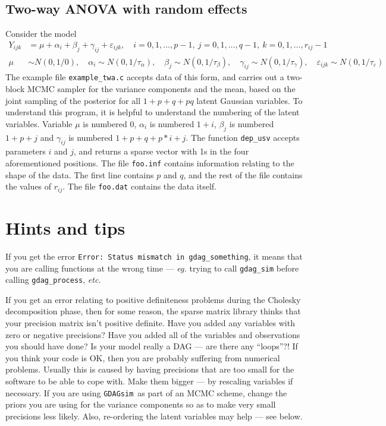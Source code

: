\documentclass[12pt,a4paper]{article}
\newcommand{\gds}{\texttt{GDAGsim}}
\newcommand{\eps}{\varepsilon}
\begin{document}
\subsection{Two-way ANOVA with random effects}

Consider the model
\begin{align*}
Y_{ijk} &= \mu + \alpha_i + \beta_j + \gamma_{ij} + \eps_{ijk},\quad
i=0,1,\ldots,p-1,\ j=0,1,\ldots,q-1,\ k=0,1,\ldots,r_{ij}-1 \\
\mu &\sim N(0,1/0),\quad \alpha_i \sim N(0,1/\tau_\alpha),\quad
\beta_j \sim N(0,1/\tau_\beta),\quad 
\gamma_{ij} \sim N(0,1/\tau_\gamma),\quad 
\eps_{ijk} \sim N(0,1/\tau_\eps)
\end{align*}
The example file \verb$example_twa.c$ accepts data of this form, and
carries out a two-block MCMC sampler for the variance components and
the mean, based on the joint sampling of the posterior for all
$1+p+q+pq$ latent Gaussian variables. To understand this program, it is
helpful to understand the numbering of the latent variables. Variable
$\mu$ is numbered 0, $\alpha_i$ is numbered $1+i$, $\beta_j$ is
numbered $1+p+j$ and $\gamma_{ij}$ is numbered $1+p+q+p*i+j$. The
function \verb$dep_usv$ accepts parameters $i$ and $j$, and returns a
sparse vector with 1s in the four aforementioned positions. The file
\verb$foo.inf$ contains information relating to the shape of the
data. The first line contains $p$ and $q$, and the rest of the file
contains the values of $r_{ij}$. The file \verb$foo.dat$ contains the
data itself.

\section{Hints and tips}

If you get the error 
\verb$Error: Status mismatch in gdag_something$, it means that you are
calling functions at the wrong time --- \emph{eg.} trying to call
\verb$gdag_sim$ before calling \verb$gdag_process$, \emph{etc.}

If you get an error relating to positive definiteness problems during
the Cholesky decomposition phase, then for some reason, the sparse
matrix library thinks that your precision matrix isn't positive
definite. Have you added any variables with zero or negative
precisions? Have you added all of the variables and observations you
should have done? Is your model really a DAG --- are there any
``loops''?! If you think your code is OK, then you are probably
suffering from numerical problems. Usually this is caused by having
precisions that are too small for the software to be able to cope
with. Make them bigger --- by rescaling variables if necessary. If you
are using \gds\ as part of an MCMC scheme, change the priors you are
using for the variance components so as to make very small precisions
less likely. Also, re-ordering the latent variables may help --- see
below.
\end{document}

